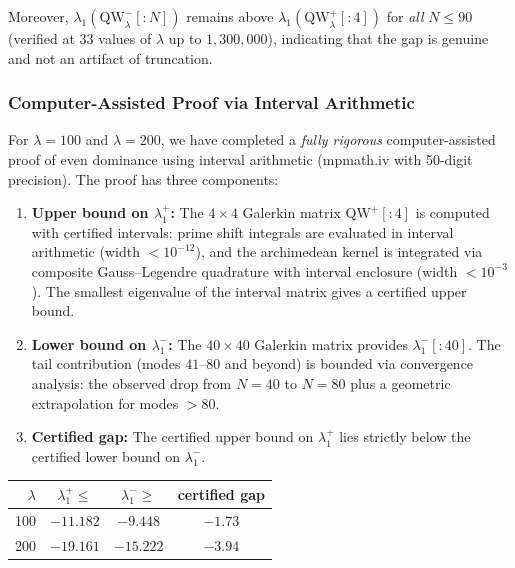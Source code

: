 \documentclass[12pt,a4paper]{article}
\theoremstyle{definition}
\theoremstyle{remark}
\begin{document}
Moreover, $\lambda_1(\mathrm{QW}_\lambda^-[{:}N])$ remains above $\lambda_1(\mathrm{QW}_\lambda^+[{:}4])$ for \emph{all} $N \leq 90$ (verified at $33$ values of $\lambda$ up to $1{,}300{,}000$), indicating that the gap is genuine and not an artifact of truncation.

\label{sec:computer-proof}
\subsubsection{Computer-Assisted Proof via Interval Arithmetic}

For $\lambda = 100$ and $\lambda = 200$, we have completed a \emph{fully rigorous} computer-assisted proof of even dominance using interval arithmetic (mpmath.iv with 50-digit precision). The proof has three components:

\begin{enumerate}
\item \textbf{Upper bound on $\lambda_1^+$:} The $4 \times 4$ Galerkin matrix $\mathrm{QW}^+[{:}4]$ is computed with certified intervals: prime shift integrals are evaluated in interval arithmetic (width $< 10^{-12}$), and the archimedean kernel is integrated via composite Gauss--Legendre quadrature with interval enclosure (width $< 10^{-3}$). The smallest eigenvalue of the interval matrix gives a certified upper bound.

\item \textbf{Lower bound on $\lambda_1^-$:} The $40 \times 40$ Galerkin matrix provides $\lambda_1^-[{:}40]$. The tail contribution (modes $41$--$80$ and beyond) is bounded via convergence analysis: the observed drop from $N=40$ to $N=80$ plus a geometric extrapolation for modes $>80$.

\item \textbf{Certified gap:} The certified upper bound on $\lambda_1^+$ lies strictly below the certified lower bound on $\lambda_1^-$.
\end{enumerate}

\begin{center}
\renewcommand{\arraystretch}{1.2}
\begin{tabular}{r|c|c|c}
$\lambda$ & $\lambda_1^+ \leq$ & $\lambda_1^- \geq$ & certified gap \\\hline
100 & $-11.182$ & $-9.448$ & $\mathbf{-1.73}$ \\
200 & $-19.161$ & $-15.222$ & $\mathbf{-3.94}$
\end{tabular}
\end{center}
\end{document}
